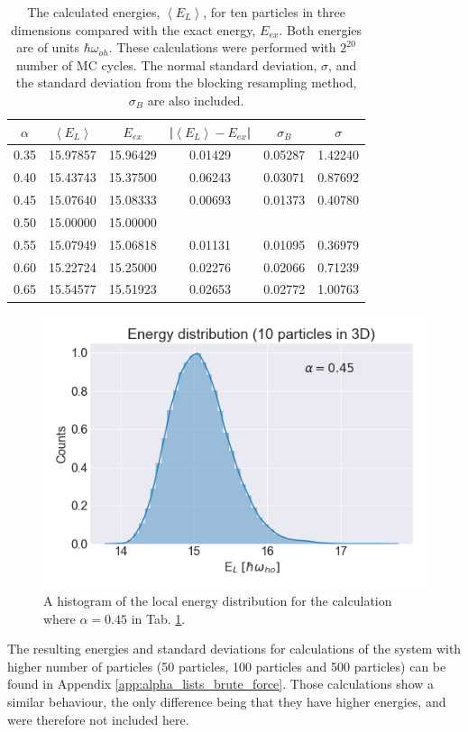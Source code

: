 \begin{table}[H]\caption{The calculated energies, $\left<E_L\right>$, for ten particles in three dimensions compared with the exact energy, $E_{ex}$. Both energies are of units $\hbar\omega_{oh}$. These calculations were performed with $2^{20}$ number of MC cycles. The normal standard deviation, $\sigma$, and the standard deviation from the blocking resampling method, $\sigma_B$ are also included.}\label{tab:brute_force_N_10_MC_20}
\center
\begin{tabular}{cccccc}
$\alpha$ & $\left< E_L \right>$ & $E_{ex}$ & |$\left< E_L \right>-E_{ex}$|  & $\sigma_B$ & $\sigma$\\ \hline
0.35 & 15.97857 & 15.96429 & 0.01429 & 0.05287 & 1.42240\\
0.40 & 15.43743 & 15.37500 & 0.06243 & 0.03071 & 0.87692\\
0.45 & 15.07640 & 15.08333 & 0.00693 & 0.01373 & 0.40780\\
0.50 & 15.00000 & 15.00000 &                &                &                \\
0.55 & 15.07949 & 15.06818 & 0.01131 & 0.01095 & 0.36979\\
0.60 & 15.22724 & 15.25000 & 0.02276 & 0.02066 & 0.71239\\
0.65 & 15.54577 & 15.51923 & 0.02653 & 0.02772 & 1.00763\\
\end{tabular}
\end{table} 

\begin{figure}[H]
\center
\includegraphics[width=0.5\linewidth]{../Results/histogram_10p_3d_alpha_45}\caption{A histogram of the local energy distribution for the calculation where $\alpha = 0.45$ in Tab. \ref{tab:brute_force_N_10_MC_20}.}\label{fig:histogram}
\end{figure}

The resulting energies and standard deviations for calculations of the system with higher number of particles (50 particles, 100 particles and 500 particles) can be found in Appendix \ref{app:alpha_lists_brute_force}. Those calculations show a similar behaviour, the only difference being that they have higher energies, and were therefore not included here. 

